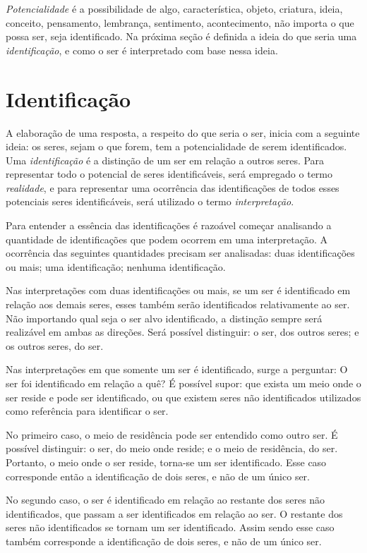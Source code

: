 \documentclass[11pt]{article}
\begin{document}
	\textit{Potencialidade} é a possibilidade de algo, característica, objeto, criatura, ideia, conceito, pensamento, lembrança, sentimento, acontecimento, não importa o que possa ser, seja identificado. Na próxima seção é definida a ideia do que seria uma \textit{identificação}, e como o ser é interpretado com base nessa ideia.
	
	\section{Identificação} \label{pt-s3}
	
	A elaboração de uma resposta, a respeito do que seria o ser, inicia com a seguinte ideia: os seres, sejam o que forem, tem a potencialidade de serem identificados. Uma \textit{identificação} é a distinção de um ser em relação a outros seres. Para representar todo o potencial de seres identificáveis, será empregado o termo \textit{realidade}, e para representar uma ocorrência das identificações de todos esses potenciais seres identificáveis, será utilizado o termo \textit{interpretação}.
	
	Para entender a essência das identificações é razoável começar analisando a quantidade de identificações que podem ocorrem em uma interpretação. A ocorrência das seguintes quantidades precisam ser analisadas: duas identificações ou mais; uma identificação; nenhuma identificação.
	
	Nas interpretações com duas identificações ou mais, se um ser é identificado em relação aos demais seres, esses também serão identificados relativamente ao ser. Não importando qual seja o ser alvo identificado, a distinção sempre será realizável em ambas as direções. Será possível distinguir: o ser, dos outros seres; e os outros seres, do ser.
	
	Nas interpretações em que somente um ser é identificado, surge a perguntar: O ser foi identificado em relação a quê? É possível supor: que exista um meio onde o ser reside e pode ser identificado, ou que existem seres não identificados utilizados como referência para identificar o ser.
	
	No primeiro caso, o meio de residência pode ser entendido como outro ser. É possível distinguir: o ser, do meio onde reside; e o meio de residência, do ser. Portanto, o meio onde o ser reside, torna-se um ser identificado. Esse caso corresponde então a identificação de dois seres, e não de um único ser.
	
	No segundo caso, o ser é identificado em relação ao restante dos seres não identificados, que passam a ser identificados em relação ao ser. O restante dos seres não identificados se tornam um ser identificado. Assim sendo esse caso também corresponde a identificação de dois seres, e não de um único ser.
	
\end{document}

